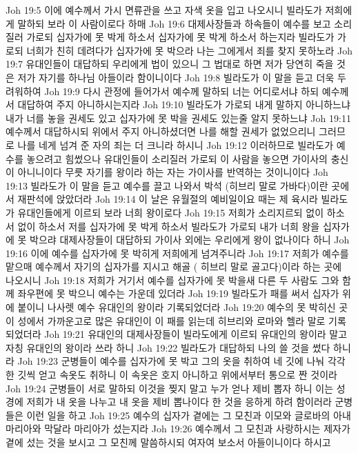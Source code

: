 Joh 19:5  이에 예수께서 가시 면류관을 쓰고 자색 옷을 입고 나오시니 빌라도가 저희에게 말하되 보라 이 사람이로다 하매
Joh 19:6  대제사장들과 하속들이 예수를 보고 소리질러 가로되 십자가에 못 박게 하소서 십자가에 못 박게 하소서 하는지라 빌라도가 가로되 너희가 친히 데려다가 십자가에 못 박으라 나는 그에게서 죄를 찾지 못하노라
Joh 19:7  유대인들이 대답하되 우리에게 법이 있으니 그 법대로 하면 저가 당연히 죽을 것은 저가 자기를 하나님 아들이라 함이니이다
Joh 19:8  빌라도가 이 말을 듣고 더욱 두려워하여
Joh 19:9  다시 관정에 들어가서 예수께 말하되 너는 어디로서냐 하되 예수께서 대답하여 주지 아니하시는지라
Joh 19:10  빌라도가 가로되 내게 말하지 아니하느냐 내가 너를 놓을 권세도 있고 십자가에 못 박을 권세도 있는줄 알지 못하느냐
Joh 19:11  예수께서 대답하시되 위에서 주지 아니하셨더면 나를 해할 권세가 없었으리니 그러므로 나를 네게 넘겨 준 자의 죄는 더 크니라 하시니
Joh 19:12  이러하므로 빌라도가 예수를 놓으려고 힘썼으나 유대인들이 소리질러 가로되 이 사람을 놓으면 가이사의 충신이 아니니이다 무릇 자기를 왕이라 하는 자는 가이사를 반역하는 것이니이다
Joh 19:13  빌라도가 이 말을 듣고 예수를 끌고 나와서 박석 (히브리 말로 가바다)이란 곳에서 재판석에 앉았더라
Joh 19:14  이 날은 유월절의 예비일이요 때는 제 육시라 빌라도가 유대인들에게 이르되 보라 너희 왕이로다
Joh 19:15  저희가 소리지르되 없이 하소서 없이 하소서 저를 십자가에 못 박게 하소서 빌라도가 가로되 내가 너희 왕을 십자가에 못 박으랴 대제사장들이 대답하되 가이사 외에는 우리에게 왕이 없나이다 하니
Joh 19:16  이에 예수를 십자가에 못 박히게 저희에게 넘겨주니라
Joh 19:17  저희가 예수를 맡으매 예수께서 자기의 십자가를 지시고 해골 ( 히브리 말로 골고다)이라 하는 곳에 나오시니
Joh 19:18  저희가 거기서 예수를 십자가에 못 박을새 다른 두 사람도 그와 함께 좌우편에 못 박으니 예수는 가운데 있더라
Joh 19:19  빌라도가 패를 써서 십자가 위에 붙이니 나사렛 예수 유대인의 왕이라 기록되었더라
Joh 19:20  예수의 못 박히신 곳이 성에서 가까운고로 많은 유대인이 이 패를 읽는데 히브리와 로마와 헬라 말로 기록되었더라
Joh 19:21  유대인의 대제사장들이 빌라도에게 이르되 유대인의 왕이라 말고 자칭 유대인의 왕이라 쓰라 하니
Joh 19:22  빌라도가 대답하되 나의 쓸 것을 썼다 하니라
Joh 19:23  군병들이 예수를 십자가에 못 박고 그의 옷을 취하여 네 깃에 나눠 각각 한 깃씩 얻고 속옷도 취하니 이 속옷은 호지 아니하고 위에서부터 통으로 짠 것이라
Joh 19:24  군병들이 서로 말하되 이것을 찢지 말고 누가 얻나 제비 뽑자 하니 이는 성경에 저희가 내 옷을 나누고 내 옷을 제비 뽑나이다 한 것을 응하게 하려 함이러라 군병들은 이런 일을 하고
Joh 19:25  예수의 십자가 곁에는 그 모친과 이모와 글로바의 아내 마리아와 막달라 마리아가 섰는지라
Joh 19:26  예수께서 그 모친과 사랑하시는 제자가 곁에 섰는 것을 보시고 그 모친께 말씀하시되 여자여 보소서 아들이니이다 하시고
